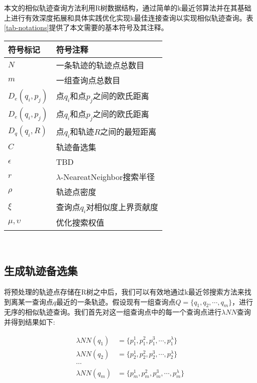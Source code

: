 本文的相似轨迹查询方法利用R树数据结构，通过简单的k最近邻算法并在其基础上进行有效深度拓展和具体实践优化实现k最佳连接查询以实现相似轨迹查询。表\ref{tab-notations}提供了本文需要的基本符号及其注释。
\\
\begin{table}[!htpb]
  	\centering
		\begin{tabular}{ |p{3cm}||p{9cm}|  }
		\hline
		符号标记 & 符号注释 \\
		\hline
		$N$ & 一条轨迹的轨迹点总数目 \\
		\hline
		$m$ & 一组查询点总数目 \\
		\hline
		$D_{e}(q_{i},p_{j})$ & 点$q_{i}$和点$p_{j}$之间的欧氏距离 \\
		\hline
		$D_{e}(q_{i},p_{j})$ & 点$q_{i}$和点$p_{j}$之间的欧氏距离 \\
		\hline
		$D_{q}(q_{i},R)$ & 点$q_{i}$和轨迹$R$之间的最短距离 \\
		\hline
		$C$ & 轨迹备选集 \\
		\hline
		$\epsilon$ & TBD\\
		\hline
		$r$ & $\lambda$-NeareatNeighbor搜索半径\\
		\hline
		$\rho$ & 轨迹点密度\\
		\hline
		$\xi$ & 查询点$q_{i}$对相似度上界贡献度\\
		\hline
		$\mu,\upsilon$ & 优化搜索权值\\
		\hline
		\end{tabular}
\end{table}
\\

\subsection{生成轨迹备选集}
\label{subsec:candidate-generation}
将预处理的轨迹点存储在R树之中后，我们可以有效地通过k最近邻搜索方法来找到离某一查询点$q$最近的一条轨迹。假设现有一组查询点$Q = \{q_{1},q_{2},\cdots, q_{m}\}$，进行无序的相似轨迹查询。我们首先对这一组查询点中的每一个查询点进行$\lambda NN$查询并得到结果如下:

\begin{align*}
\lambda NN(q_{1}) &= \{p_{1}^{1}, p_{1}^{2}, p_{1}^{3}, \cdots, p_{1}^{\lambda}\}\\ 
\lambda NN(q_{2}) &= \{p_{2}^{1}, p_{2}^{2}, p_{2}^{3}, \cdots, p_{2}^{\lambda}\}\\ 
\cdots\\
\lambda NN(q_{m}) &= \{p_{m}^{1}, p_{m}^{2}, p_{m}^{3}, \cdots, p_{m}^{\lambda}\}
\end{align*}

